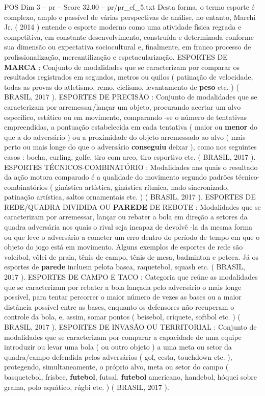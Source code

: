 \begin{textsample}{POS Dim 3 – pr – Score 32.00 – pr/pr\_ef\_5.txt}
Desta forma, o termo esporte é complexo, amplo e passível de várias perspectivas de análise, no entanto, Marchi Jr. ( 2014 ) entende o esporte moderno como uma atividade física regrada e competitiva, em constante desenvolvimento, construída e determinada conforme sua dimensão ou expectativa sociocultural e, finalmente, em franco processo de profissionalização, mercantilização e espetacularização.
ESPORTES DE \textbf{MARCA} : Conjunto de modalidades que se caracterizam por comparar os resultados registrados em segundos, metros ou quilos ( patinação de velocidade, todas as provas do atletismo, remo, ciclismo, levantamento de \textbf{peso} etc. ) ( BRASIL, 2017 ).
ESPORTES DE PRECISÃO : Conjunto de modalidades que se caracterizam por arremessar/lançar um objeto, procurando acertar um alvo específico, estático ou em movimento, comparando -se o número de tentativas empreendidas, a pontuação estabelecida em cada tentativa ( maior ou \textbf{menor} do que a do adversário ) ou a proximidade do objeto arremessado ao alvo ( mais perto ou mais longe do que o adversário \textbf{conseguiu} deixar ), como nos seguintes casos : bocha, curling, golfe, tiro com arco, tiro esportivo etc. ( BRASIL, 2017 ).
ESPORTES TÉCNICOS-COMBINATÓRIO : Modalidades nas quais o resultado da ação motora comparado é a qualidade do movimento segundo padrões técnico-combinatórios ( ginástica artística, ginástica rítmica, nado sincronizado, patinação artística, saltos ornamentais etc. ) ( BRASIL, 2017 ).
ESPORTES DE REDE/QUADRA DIVIDIDA OU \textbf{PAREDE} DE REBOTE : Modalidades que se caracterizam por arremessar, lançar ou rebater a bola em direção a setores da quadra adversária nos quais o rival seja incapaz de devolvê -la da mesma forma ou que leve o adversário a cometer um erro dentro do período de tempo em que o objeto do jogo está em movimento.
Alguns exemplos de esportes de rede são voleibol, vôlei de praia, tênis de campo, tênis de mesa, badminton e peteca.
Já os esportes de \textbf{parede} incluem pelota basca, raquetebol, squash etc. ( BRASIL, 2017 ).
ESPORTES DE CAMPO E TACO : Categoria que reúne as modalidades que se caracterizam por rebater a bola lançada pelo adversário o mais longe possível, para tentar percorrer o maior número de vezes as bases ou a maior distância possível entre as bases, enquanto os defensores não recuperam o controle da bola, e, assim, somar pontos ( beisebol, críquete, softbol etc. ) ( BRASIL, 2017 ).
ESPORTES DE INVASÃO OU TERRITORIAL : Conjunto de modalidades que se caracterizam por comparar a capacidade de uma equipe introduzir ou levar uma bola ( ou outro objeto ) a uma meta ou setor da quadra/campo defendida pelos adversários ( gol, cesta, touchdown etc. ), protegendo, simultaneamente, o próprio alvo, meta ou setor do campo ( basquetebol, frisbee, \textbf{futebol}, futsal, \textbf{futebol} americano, handebol, hóquei sobre grama, polo aquático, rúgbi etc. ) ( BRASIL, 2017 ).

\end{textsample}
